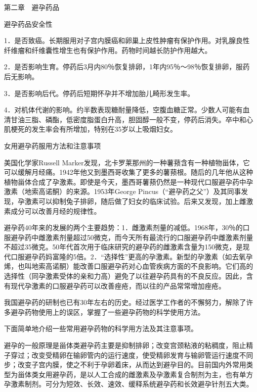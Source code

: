 \documentclass[12pt,UTF8]{ctexbook}
\begin{document}
第二章　避孕药品


避孕药品安全性


1．是否致癌。长期服用对子宫内膜癌和卵巢上皮性肿瘤有保护作用。对乳腺良性纤维瘤和纤维囊性增生也有保护作用。药物时间越长防护作用越大。

2．是否影响生育。停药后3月内80％恢复排卵，1年内95％～98％恢复排卵，服药后无影响。

3．是否影响后代。停药后短期怀孕并不增加胎儿畸形发生率。

4．对机体代谢的影响。约半数表现糖耐量降低，空腹血糖正常。少数人可能有血清甘油三脂、磷酯，低密度脂蛋白升高，胆固醇一般不变，停药后消失。卒中和心肌梗死的发生率会有所增加，特别在35岁以上吸烟妇女。





女用避孕药服用方法和注意事项


美国化学家Russell Marker发现，北卡罗莱那州的一种薯蓣含有一种植物甾体，它可以缓解月经痛。1942年他又到墨西哥收集了更多的薯蓣根。随后的几年他从这种植物甾体合成了孕激素。即使是今天，墨西哥薯蓣仍然是一种现代口服避孕药中孕激素（地索高诺酮）的来源。1953年George Pincus（“避孕药之父”）及其同事发现，孕激素可以抑制兔子排卵，随后做了妇女的临床试验。后来又发现，加上雌激素成分可以改善月经的规律性。

避孕药40年来的发展的两个主要趋势：1．雌激素剂量的减低。1968年，30％的口服避孕药中雌激素剂量超过50微克，而今天所有最流行的口服避孕药中雌激素剂量不超过35微克。50年代首次用于临床研究的避孕药的雌激素含量为150微克，是现代口服避孕药妈富隆的5倍。2．“选择性”更高的孕激素。新型的孕激素（如去氧孕烯，也叫地索高诺酮）能改善口服避孕药对心血管疾病方面的不良影响。它们高的选择性（同孕激素受体的亲和力高）避免了以往避孕药具有的不良反应。因此，含有现代孕激素的口服避孕药可以改善痤疮，而以往的产品常常增加痤疮。

我国避孕药的研制也已有30年左右的历史。经过医学工作者的不懈努力，解除了许多避孕药物使用上的误区，掌握了一些避孕药物的科学使用方法。

下面简单地介绍一些常用避孕药物的科学用方法及其注意事项。

避孕的一般原理是甾体类避孕药主要是抑制排卵；改变宫颈粘液的粘稠度，阻止精子穿过；改变受精卵在输卵管内的运行速度，使受精卵发育与输卵管运行速度不同步；改变子宫内膜，使之不利于孕卵着床，从而达到避孕目的。目前国内外常用类型为甾体类女用避孕药，是以人工合成的雌激素及孕激素复合制剂为主，也有单方孕激素制剂。可分为短效、长效、速效、缓释系统避孕药和长效避孕针剂五大类。
\end{document}
